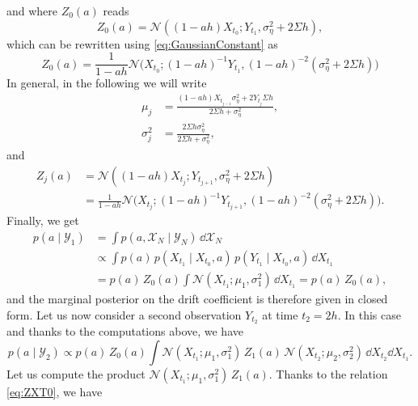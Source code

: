 \documentclass[10pt]{article}
\begin{document}
and where $Z_0(a)$ reads
\begin{equation}
	Z_0(a) = \mathcal N((1-ah)X_{t_0}; Y_{t_1}, \sigma_\eta^2 + 2\Sigma h),
\end{equation}
which can be rewritten using \eqref{eq:GaussianConstant} as
\begin{equation}\label{eq:ZXT0}
	Z_0(a) = \frac{1}{1 - ah} \mathcal N\big(X_{t_0}; (1-ah)^{-1} Y_{t_1}, (1-ah)^{-2} (\sigma_\eta^2 + 2\Sigma h)\big)
\end{equation}
In general, in the following we will write
\begin{equation}
\begin{aligned}
	\mu_j &= \frac{(1-ah)X_{t_{j-1}} \sigma_\eta^2 + 2 Y_{t_j}\Sigma h}{2\Sigma h + \sigma_\eta^2},\\
	\sigma_j^2 &= \frac{2\Sigma h \sigma_\eta^2}{2\Sigma h + \sigma_\eta^2}, 
\end{aligned}
\end{equation}
and
\begin{equation}
\begin{aligned}
	Z_j(a) &= \mathcal N((1-ah)X_{t_j}; Y_{t_{j+1}}, \sigma_\eta^2 + 2\Sigma h)\\
	&= \frac{1}{1 - ah} \mathcal N\big(X_{t_j}; (1-ah)^{-1} Y_{t_{j+1}}, (1-ah)^{-2} (\sigma_\eta^2 + 2\Sigma h)\big).
\end{aligned}
\end{equation}
Finally, we get
\begin{equation}
\begin{aligned}
	p(a \mid \mathcal Y_1) &= \int p(a, \mathcal X_N \mid \mathcal Y_N)\, \dd \mathcal X_N\\
	&\propto \int p(a) \, p(X_{t_1} \mid X_{t_0}, a) \, p(Y_{t_1} \mid X_{t_0}, a) \, \dd X_{t_1} \\
	&= p(a) \, Z_0(a) \int \mathcal N(X_{t_1}; \mu_1, \sigma_1^2)\, \dd X_{t_1} = p(a) \, Z_0(a),
\end{aligned}
\end{equation}
and the marginal posterior on the drift coefficient is therefore given in closed form. Let us now consider a second observation $Y_{t_2}$ at time $t_2 = 2h$. In this case and thanks to the computations above, we have
\begin{equation}\label{eq:TwoObs}
	p(a \mid \mathcal Y_2) \propto p(a) \, Z_0(a) \int \mathcal N(X_{t_1}; \mu_1, \sigma_1^2) \, Z_1(a) \, \mathcal N(X_{t_2}; \mu_2, \sigma_2^2) \, \dd X_{t_2} \dd X_{t_1}.
\end{equation}
Let us compute the product $\mathcal N(X_{t_1}; \mu_1, \sigma_1^2) \, Z_1(a)$. Thanks to the relation \eqref{eq:ZXT0}, we have
\end{document}

